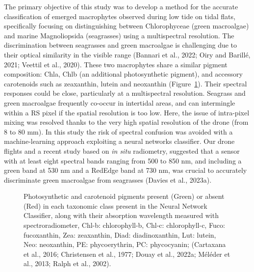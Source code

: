\documentclass[
  letterpaper,
  11pt,
  english,
  singlespacing,
  headsepline]{MastersDoctoralThesis}
\begin{document}
\begin{spacing}{1.5}
The primary objective of this study was to develop a method for the
accurate classification of emerged macrophytes observed during low tide
on tidal flats, specifically focusing on distinguishing between
Chlorophyceae (green macroalgae) and marine Magnoliopsida (seagrasses)
using a multispectral resolution. The discrimination between seagrasses
and green macroalgae is challenging due to their optical similarity in
the visible range (Bannari et al., 2022; Oiry and Barillé, 2021; Veettil
et al., 2020). These two macrophytes share a similar pigment
composition: Chla, Chlb (an additional photosynthetic pigment), and
accessory carotenoids such as zeaxanthin, lutein and neoxanthin
(Figure~\ref{fig-Pigm}). Their spectral responses could be close,
particularly at a multispectral resolution. Seagrass and green
macroalgae frequently co-occur in intertidal areas, and can intermingle
within a RS pixel if the spatial resolution is too low. Here, the issue
of intra-pixel mixing was resolved thanks to the very high spatial
resolution of the drone (from 8 to 80 mm). In this study the risk of
spectral confusion was avoided with a machine-learning approach
exploiting a neural networks classifier. Our drone flights and a recent
study based on \emph{in situ} radiometry, suggested that a sensor with
at least eight spectral bands ranging from 500 to 850 nm, and including
a green band at 530 nm and a RedEdge band at 730 nm, was crucial to
accurately discriminate green macroalgae from seagrasses (Davies et al.,
2023a).

\begin{figure}


\caption{\label{fig-Pigm}Photosynthetic and carotenoid pigments present
(Green) or absent (Red) in each taxonomic class present in the Neural
Network Classifier, along with their absorption wavelength measured with
spectroradiometer, Chl-b: chlorophyll-b, Chl-c: chlorophyll-c, Fuco:
fucoxanthin, Zea: zeaxanthin, Diad: diadinoxanthin, Lut: lutein, Neo:
neoxanthin, PE: phycoerythrin, PC: phycocyanin; (Cartaxana et al., 2016;
Christensen et al., 1977; Douay et al., 2022a; Méléder et al., 2013;
Ralph et al., 2002).}


\end{figure}
\end{spacing}
\end{document}
